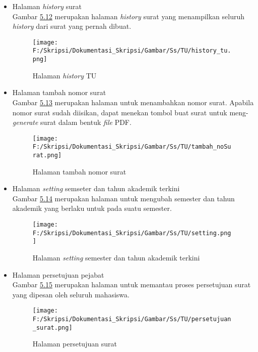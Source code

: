 \begin{itemize}
	\item Halaman \textit{history} surat\\
	 Gambar \hyperlink{halaman_history_tu}{5.12} merupakan halaman \textit{history} surat yang menampilkan seluruh \textit{history} dari surat yang pernah dibuat.
	 \begin{figure}[H]
	\centering
		\texttt{[image: F:/Skripsi/Dokumentasi\_Skripsi/Gambar/Ss/TU/history\_tu.png]}
		\caption{Halaman \textit{history} TU}
		\label{fig:halaman_history_tu}
	\end{figure}
	
	\item Halaman tambah nomor surat\\
	 Gambar \hyperlink{halaman_tambah_nomor_surat}{5.13} merupakan halaman untuk menambahkan nomor surat. Apabila nomor surat sudah diisikan, dapat menekan tombol buat surat untuk meng-\textit{generate} surat dalam bentuk \textit{file} PDF.
	 \begin{figure}[H]
	\centering
		\texttt{[image: F:/Skripsi/Dokumentasi\_Skripsi/Gambar/Ss/TU/tambah\_noSurat.png]}
		\caption{Halaman tambah nomor surat}
		\label{fig:halaman_tambah_nomor_surat}
	\end{figure}
	
	\item Halaman \textit{setting} semseter dan tahun akademik terkini\\
	 Gambar \hyperlink{halaman_setting_semester_dan_tahun_akademik_terkini}{5.14} merupakan halaman untuk mengubah semester dan tahun akademik yang berlaku untuk pada suatu semester.
	 \begin{figure}[H]
	\centering
		\texttt{[image: F:/Skripsi/Dokumentasi\_Skripsi/Gambar/Ss/TU/setting.png]}
		\caption{Halaman \textit{setting} semester dan tahun akademik terkini}
		\label{fig:halaman_setting_semester_dan_tahun_akademik_terkini}
	\end{figure}
	
	\item Halaman persetujuan pejabat\\
	 Gambar \hyperlink{halaman_persetujuan_surat}{5.15} merupakan halaman untuk memantau proses persetujuan surat yang dipesan oleh seluruh mahasiswa.
	 \begin{figure}[H]
	\centering
		\texttt{[image: F:/Skripsi/Dokumentasi\_Skripsi/Gambar/Ss/TU/persetujuan\_surat.png]}
		\caption{Halaman persetujuan surat}
		\label{fig:halaman_persetujuan_surat}
	\end{figure}
\end{itemize}
	
